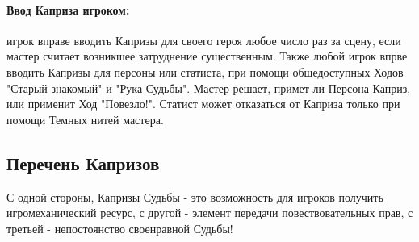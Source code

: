 \paragraph{Ввод Каприза игроком:} игрок вправе вводить Капризы для своего героя любое число раз за сцену, если мастер считает возникшее затруднение существенным.
\newline Также любой игрок впрве вводить Капризы для персоны или статиста, при помощи общедоступных Ходов "Старый знакомый" и "Рука Судьбы". Мастер решает, примет ли Персона Каприз, или применит Ход "Повезло!". Статист может отказаться от Каприза только при помощи Темных нитей мастера.

\subsection{Перечень Капризов}
С одной стороны, Капризы Судьбы - это возможность для игроков получить игромеханический ресурс, с другой - элемент передачи повествовательных прав, с третьей - непостоянство своенравной Судьбы!

